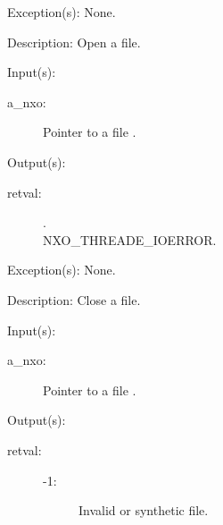 \begin{capi}
\begin{capilist}
\begin{description}
		\end{description}
	\item[Exception(s): ] None.
	\item[Description: ]
		Open a file.
	\end{capilist}
\label{nxo_file_close}
	\begin{capilist}
	\item[Input(s): ]
		\begin{description}\item[]
		\item[a\_nxo: ]
			Pointer to a file .
		\end{description}
	\item[Output(s): ]
		\begin{description}\item[]
		\item[retval: ]
			\begin{description}\item[]
			\item[.]
			\item[
				{NXO_THREADE_IOERROR}.]
			\end{description}
		\end{description}
	\item[Exception(s): ] None.
	\item[Description: ]
		Close a file.
	\end{capilist}
\label{nxo_file_fd_get}
	\begin{capilist}
	\item[Input(s): ]
		\begin{description}\item[]
		\item[a\_nxo: ]
			Pointer to a file \classname{nxo}.
		\end{description}
	\item[Output(s): ]
		\begin{description}\item[]
		\item[retval: ]
			\begin{description}\item[]
			\item[-1: ]
				Invalid or synthetic file.

\end{description}
\end{description}
\end{capilist}
\end{capi}
